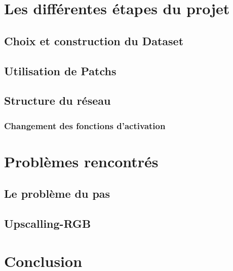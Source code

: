 \documentclass[12pt, a4paper]{article}
\begin{document}
\section{Les différentes étapes du projet}
	\subsection{Choix et construction du Dataset}

	\subsection{Utilisation de Patchs}
	\subsection{Structure du réseau}
	\subsubsection{Changement des fonctions d'activation}
\section{Problèmes rencontrés}
	\subsection{Le problème du pas}
	\subsection{Upscalling-RGB}

\section*{Conclusion}
\end{document}
